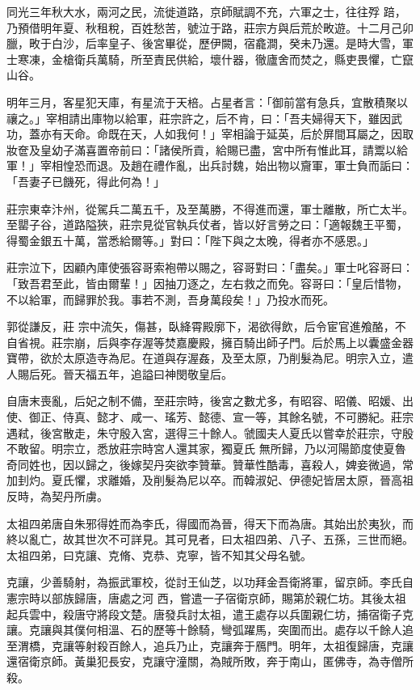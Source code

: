 \begin{pinyinscope}
 同光三年秋大水，兩河之民，流徙道路，京師賦調不充，六軍之士，往往殍
 踣，乃預借明年夏、秋租稅，百姓愁苦，號泣于路，莊宗方與后荒於畋遊。十二月己卯臘，畋于白沙，后率皇子、後宮畢從，歷伊闕，宿龕澗，癸未乃還。是時大雪，軍士寒凍，金槍衛兵萬騎，所至責民供給，壞什器，徹廬舍而焚之，縣吏畏懼，亡竄山谷。



 明年三月，客星犯天庫，有星流于天棓。占星者言：「御前當有急兵，宜散積聚以禳之。」宰相請出庫物以給軍，莊宗許之，后不肯，曰：「吾夫婦得天下，雖因武功，蓋亦有天命。命既在天，人如我何！」宰相論于延英，后於屏間耳屬之，因取妝奩及皇幼子滿喜置帝前曰：「諸侯所貢，給賜已盡，宮中所有惟此耳，請鬻以給
 軍！」宰相惶恐而退。及趙在禮作亂，出兵討魏，始出物以齎軍，軍士負而詬曰：「吾妻子已饑死，得此何為！」



 莊宗東幸汴州，從駕兵二萬五千，及至萬勝，不得進而還，軍士離散，所亡太半。至罌子谷，道路隘狹，莊宗見從官執兵仗者，皆以好言勞之曰：「適報魏王平蜀，得蜀金銀五十萬，當悉給爾等。」對曰：「陛下與之太晚，得者亦不感恩。」



 莊宗泣下，因顧內庫使張容哥索袍帶以賜之，容哥對曰：「盡矣。」軍士叱容哥曰：「致吾君至此，皆由爾輩！」因抽刀逐之，左右救之而免。容哥曰：「皇后惜物，不以給軍，而歸罪於我。事若不測，吾身萬段矣！」乃投水而死。



 郭從謙反，莊
 宗中流矢，傷甚，臥絳霄殿廓下，渴欲得飲，后令宦官進飧酪，不自省視。莊宗崩，后與李存渥等焚嘉慶殿，擁百騎出師子門。后於馬上以囊盛金器寶帶，欲於太原造寺為尼。在道與存渥姦，及至太原，乃削髮為尼。明宗入立，遣人賜后死。晉天福五年，追謚曰神閔敬皇后。



 自唐末喪亂，后妃之制不備，至莊宗時，後宮之數尤多，有昭容、昭儀、昭媛、出使、御正、侍真、懿才、咸一、瑤芳、懿德、宣一等，其餘名號，不可勝紀。莊宗遇弒，後宮散走，朱守殷入宮，選得三十餘人。虢國夫人夏氏以嘗幸於莊宗，守殷不敢留。明宗立，悉放莊宗時宮人還其家，獨夏氏
 無所歸，乃以河陽節度使夏魯奇同姓也，因以歸之，後嫁契丹突欲李贊華。贊華性酷毒，喜殺人，婢妾微過，常加刲灼。夏氏懼，求離婚，及削髮為尼以卒。而韓淑妃、伊德妃皆居太原，晉高祖反時，為契丹所虜。



 太祖四弟唐自朱邪得姓而為李氏，得國而為晉，得天下而為唐。其始出於夷狄，而終以亂亡，故其世次不可詳見。其可見者，曰太祖四弟、八子、五孫，三世而絕。太祖四弟，曰克讓、克脩、克恭、克寧，皆不知其父母名號。



 克讓，少善騎射，為振武軍校，從討王仙芝，以功拜金吾衛將軍，留京師。李氏自憲宗時以部族歸唐，唐處之河
 西，嘗遣一子宿衛京師，賜第於親仁坊。其後太祖起兵雲中，殺唐守將段文楚。唐發兵討太祖，遣王處存以兵圍親仁坊，捕宿衛子克讓。克讓與其僕何相溫、石的歷等十餘騎，彎弧躍馬，突圍而出。處存以千餘人追至渭橋，克讓等射殺百餘人，追兵乃止，克讓奔于鴈門。明年，太祖復歸唐，克讓還宿衛京師。黃巢犯長安，克讓守潼關，為賊所敗，奔于南山，匿佛寺，為寺僧所殺。




\end{pinyinscope}
